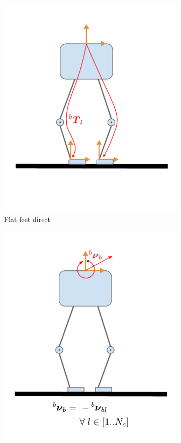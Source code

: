 \begin{figure}
\begin{subfigure}{.33\linewidth}
        \includegraphics[width=\textwidth]{figures/robot_kinematic_types_flat_direct.pdf}
        \caption{Flat feet direct}
        \label{fig:kin_flat_direct}
    \end{subfigure}%
        \hfill
    \begin{subfigure}{.33\linewidth}
        \centering
        \includegraphics[width=\textwidth]{figures/robot_kinematic_types_flat_vel.pdf}

\end{subfigure}
\end{figure}
